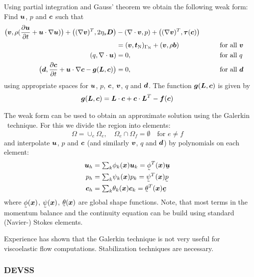 Using partial integration and Gauss'
theorem we obtain the following weak form: 
Find $\boldsymbol{u}$, $p$ and $\boldsymbol{c}$ such that
\begin{alignat}{2}
 \big(\boldsymbol{v},\rho(\dfrac{\partial \boldsymbol{u}}{\partial t}+\boldsymbol{u}\cdot\nabla\boldsymbol{u})\big) +
  \big((\nabla\boldsymbol{v})^T,2\eta_s\boldsymbol{D}\big)
    &-(\nabla\cdot\boldsymbol{v},p)+\big((\nabla\boldsymbol{v})^T,\boldsymbol{\tau}(\boldsymbol{c})\big)\notag\\
    &=(\boldsymbol{v},\boldsymbol{t}_{\text{N}})_{\Gamma_{\text{N}}}+(\boldsymbol{v},\rho\boldsymbol{b})
&\qquad&\text{for all }\boldsymbol{v}\label{eq:weakmomentumSUPG}\\
  \,(q,\nabla\cdot\boldsymbol{u})&=0,&\qquad&\text{for all }q\\
 \big(\boldsymbol{d},\dfrac{\partial \boldsymbol{c}}{\partial t}
+\boldsymbol{u}\cdot\nabla\boldsymbol{c}-\boldsymbol{g}(\boldsymbol{L},\boldsymbol{c})\big)&= 0,
  &\qquad&\text{for all }\boldsymbol{d}\label{eq:weakc}
\end{alignat}
using appropriate spaces for $\boldsymbol{u}$, $p$, $\boldsymbol{c}$, $\boldsymbol{v}$, $q$ and $\boldsymbol{d}$. The function $\boldsymbol{g}(\boldsymbol{L},\boldsymbol{c})$ is given by
\begin{equation}
\boldsymbol{g}(\boldsymbol{L},\boldsymbol{c})=\boldsymbol{L}\cdot\boldsymbol{c}+\boldsymbol{c}\cdot\boldsymbol{L}^T
 -\boldsymbol{f}(\boldsymbol{c})
\end{equation}

The weak form can be used to obtain an approximate solution using the 
Galerkin \fem\ technique. For this we divide the region into elements:
\[
\Omega=\cup_e\Omega_e, \quad\Omega_{e}\cap\Omega_{f}=\emptyset\quad
   \text{for }e\neq f
\]
and interpolate $\boldsymbol{u}$, $p$ and $\boldsymbol{c}$ 
(and similarly $\boldsymbol{v}$, $q$ and $\boldsymbol{d}$) by
polynomials on each element:
\begin{align}
    \vek u_h&=\tsum_k \phi_k(\vek x)\vek u_k=\col\phi^T(\vek x)\col{\vek u}\\
    p_h&=\tsum_k \psi_k(\vek x) p_k=\col\psi^T(\vek x)\col{ p} \\
  \ten c_h&=\tsum_k \theta_k(\vek x)\ten c_k=\col\theta^T(\vek x)\col{\ten c}
  \label{eq:theta}
\end{align}
where $\col\phi(\vek x)$, $\col\psi(\vek x)$, $\col\theta(\vek x)$
are global shape functions. Note, that most terms in the momentum balance and
the continuity equation can be build using standard (Navier-) Stokes elements.

Experience has shown that the Galerkin technique is not very useful for
viscoelastic flow computations. Stabilization techniques are necessary.

\subsubsection{DEVSS}

